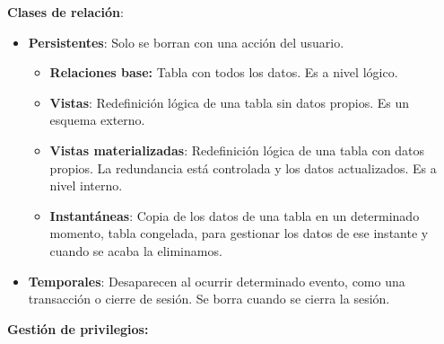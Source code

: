 \documentclass[12pt, twoside, openright]{report} %
\begin{document}
  
  \textbf{Clases de relación}:
  

  \begin{itemize}
  \item \textbf{Persistentes}: Solo se borran con una acción del usuario.
    

    \begin{itemize}
    \item \textbf{Relaciones base:} Tabla con todos los datos. Es a nivel
      lógico.
      
    \item \textbf{Vistas}: Redefinición lógica de una tabla sin datos
      propios. Es un esquema externo.
      
    \item \textbf{Vistas materializadas}: Redefinición lógica de una tabla
      con datos propios. La redundancia está controlada y los datos
      actualizados. Es a nivel interno.
      
    \item \textbf{Instantáneas}: Copia de los datos de una tabla en un
      determinado momento, tabla congelada, para gestionar los datos de
      ese instante y cuando se acaba la eliminamos.
      
    \end{itemize}
  \item \textbf{Temporales}: Desaparecen al ocurrir determinado evento, como
    una transacción o cierre de sesión. Se borra cuando se cierra la
    sesión.
    
  \end{itemize}

  
  \textbf{Gestión de privilegios:}
  
\end{document}
